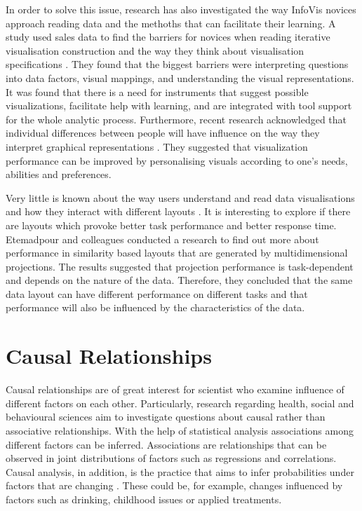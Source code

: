 \documentclass{l4proj}
\begin{document}
In order to solve this issue, research has also investigated the way InfoVis novices approach reading data and the methoths that can facilitate their learning. A study used sales data to find the barriers for novices when reading iterative visualisation construction and the way they think about visualisation specifications \cite{grammel2010information}. They found that the biggest barriers were interpreting questions into data factors, visual mappings, and understanding the visual representations. It was found that there is a need for instruments that suggest possible visualizations, facilitate help with learning, and are integrated with tool support for the whole analytic process. Furthermore, recent research acknowledged that individual differences between people will have influence on the way they interpret graphical representations \cite{Steichen:2013:UIV:2449396.2449439}. They suggested that visualization performance can be improved by personalising visuals according to one's needs, abilities and preferences.

Very little is known about the way users understand and read data visualisations and how they interact with different layouts \cite{etemadpour2015perception}. It is interesting to explore if there are layouts which provoke better task performance and better response time. Etemadpour and colleagues \cite{etemadpour2015perception} conducted a research to find out more about performance in similarity based layouts that are generated by multidimensional projections. The results suggested that projection performance is task-dependent and depends on the nature of the data. Therefore, they concluded that the same data layout can have different performance on different tasks and that performance will also be influenced by the characteristics of the data.

\section{Causal Relationships}

Causal relationships are of great interest for scientist who examine influence of different factors on each other. Particularly, research regarding health, social and behavioural sciences aim to investigate questions about causal rather than associative relationships. With the help of statistical analysis associations among different factors can be inferred. Associations are relationships that can be observed in joint distributions of factors such as regressions and correlations. Causal analysis, in addition, is the practice that aims to infer probabilities under factors that are changing \cite{pearl2010introduction}. These could be, for example, changes influenced by factors such as drinking, childhood issues or applied treatments.  
\end{document}
